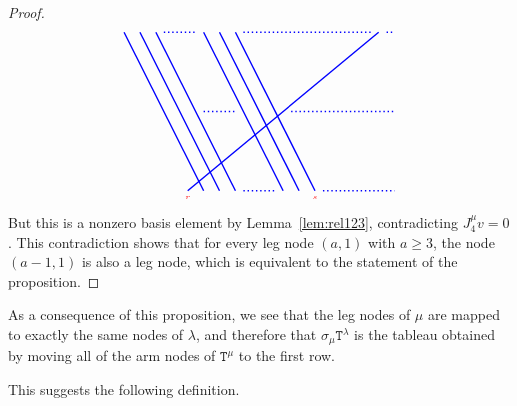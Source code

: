\documentclass[twoside,11pt,reqno,letter]{amsart}
\numberwithin{equation}{section}
\theoremstyle{definition}  %
\DeclareMathOperator\ledom{\trianglelefteq}
\newcommand{\Hom}{\operatorname{Hom}}
\newcommand{\0}{{\bar 0}}
\newcommand{\1}{{\bar 1}}
\newcommand{\ga}{\gamma}
\newcommand{\la}{\lambda}
\newcommand{\si}{\sigma}
\def\T{{\mathtt T}}
\newenvironment{braid}{%
  \begin{tikzpicture}[baseline=6mm,blue,line width=1pt, scale=0.4,
                      draw/.append style={rounded corners},
                      every node/.append style={font=\tiny}]%
  }{\end{tikzpicture}
}
\begin{document}
{\begin{proof}
\[\begin{braid}
    \draw(1,10)--(6,0);
    \draw(2,10)--(7,0);
    \draw(3,10)--(8,0);

    \draw[dotted](3.5,10)--(5.5,10);
    \draw[dotted](6,5)--(8,5);
    \draw[dotted](8.5,0)--(10.5,0);

    \draw(6,10)--(11,0);
    \draw(7,10)--(12,0);
    \draw(8,10)--(13,0)node[below,color=red]{$s$};

    \draw[dotted](8.5,10)--(16.5,10);

    \draw(17,10)--(5,0)node[below,color=red]{$r$};

    \draw[dotted](17.5,10)--(18,10);
    \draw[dotted](11.5,5)--(18,5);
    \draw[dotted](13.5,0)--(18,0);
  \end{braid}
\]
\fi
But this is a nonzero basis element by Lemma~\ref{lem:rel123}, contradicting $J^\mu_4 v = 0$. This contradiction shows that for every leg node $(a,1)$ with $a \geq 3$, the node $(a-1,1)$ is also a leg node, which is equivalent to the statement of the proposition.
\end{proof}










As a consequence of this proposition, we see that the leg nodes of $\mu$ are mapped to exactly the same nodes of $\la$, and therefore that $\si_{\mu} \T^\la$ is the tableau obtained by moving all of the arm nodes of $\T^\mu$ to the first row.
\iffalse{This is illustrated in the following example, where $\mu = (7, 5, 3, 3, 1)$ and $\la = (15, 1^{4})$. Any homomorphism $S^\mu \to S^\la$ must send $z^{(7,5,3,3,1)}$ to a multiple of the $\la$-tableau as depicted below.
\[
\begin{tikzpicture}[scale=0.5,draw/.append style={thick,black},baseline=1mm]
  \fill[red!50](0.5,-0.5)rectangle(1.5,-4.5);
  \newcount\col
  \foreach\Row/\row in {{1,...,7}/0,{8,...,12}/-1,{13,14,15}/-2,{16,17,18}/-3,{19}/-4} {
     \col=1
     \foreach\k in \Row {
        \draw(\the\col,\row)+(-.5,-.5)rectangle++(.5,.5);
        \draw(\the\col,\row)node{\k};
        \global\advance\col by 1
      }
   }
  \draw[|->](7,-2)--(10,-2)node[right]{$\ga$};
  \newcount\col
  \foreach\Row/\row in {{1,...,7,9,10,11,12,14,15,17,18}/0,{8}/-1,{13}/-2,{16}/-3,{19}/-4} {
     \col=1
     \foreach\k in \Row {
        \draw(11+\the\col,\row)+(-.5,-.5)rectangle++(.5,.5);
        \draw(11+\the\col,\row)node{\k};
        \global\advance\col by 1
      }
   }
\end{tikzpicture}
\]
}\fi
This suggests the following definition.



}
\end{document}
